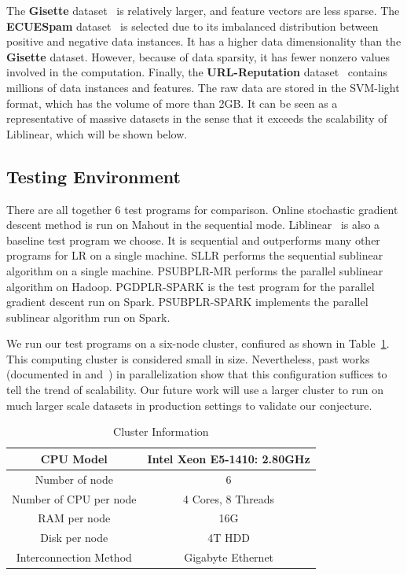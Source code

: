 \documentclass[10pt, conference, compsocconf]{IEEEtran}
\begin{document}
The \textbf{Gisette} dataset~\cite{guyon2004result} is relatively larger, and feature vectors are less sparse.
The \textbf{ECUESpam} dataset~\cite{DelanyKBS05} is selected due to its imbalanced distribution between positive and negative data instances. It has a higher data dimensionality than the \textbf{Gisette} dataset. However, because of data sparsity, it has fewer nonzero values involved in the computation.
Finally, the \textbf{URL-Reputation} dataset~\cite{ma2009identifying} contains millions of data instances and features. The raw data are stored in the SVM-light format, which has the volume of more than 2GB. It can be seen as a representative of massive datasets in the sense that it exceeds the scalability of Liblinear, which will be shown below.

\subsection{Testing Environment}
There are all together 6 test programs for comparison.
Online stochastic gradient descent method is run on Mahout in the sequential mode.
Liblinear~\cite{fan2008liblinear} is also a baseline test program we choose. It is sequential and outperforms many other programs for LR on a single machine.
SLLR performs the sequential sublinear algorithm on a single machine.
PSUBPLR-MR performs the parallel sublinear algorithm on Hadoop.
PGDPLR-SPARK is the test program for the parallel gradient descent run on Spark.
PSUBPLR-SPARK implements the parallel sublinear algorithm run on Spark.

We run our test programs on a six-node cluster, confiured as shown in Table~\ref{tab:table2}.  This computing cluster is considered small in size.  Nevertheless, past works (documented in \cite{chang2011foundations} and~\cite{Bekkerman2012}) in parallelization show that this configuration suffices to tell the trend of scalability.  Our future work will use a  larger cluster to run on much larger scale datasets in production settings to validate our conjecture.

\begin{table}[h]
\centering
\caption{Cluster Information}\label{tab:table2}\vspace{-0.3cm}
\begin{tabular}{|c|c|}
\hline
    CPU Model & Intel Xeon E5-1410: 2.80GHz \\
\hline
    Number of node & 6 \\
\hline
    Number of CPU per node & 4 Cores, 8 Threads \\
\hline
    RAM per node & 16G \\
\hline
    Disk per node & 4T HDD\\
\hline
    Interconnection Method & Gigabyte Ethernet  \\
\hline
\end{tabular}
\end{table}
\end{document}
